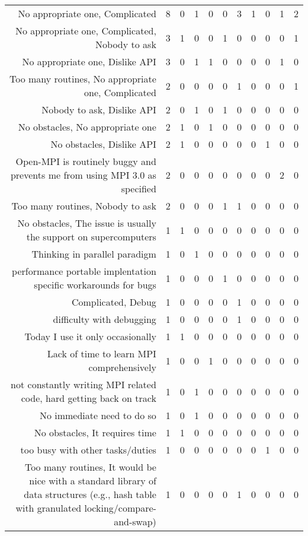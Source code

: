 {\begin{landscape}
\begin{longtable}[htb]{r|c|c|c|c|c|c|c|c|c|c}
{No appropriate one, Complicated} & 8 & 0 & 1 & 0 & 0 & 3 & 1 & 0 & 1 & 2 \\%
{No appropriate one, Complicated, Nobody to ask} & 3 & 1 & 0 & 0 & 1 & 0 & 0 & 0 & 0 & 1 \\%
{No appropriate one, Dislike API} & 3 & 0 & 1 & 1 & 0 & 0 & 0 & 0 & 1 & 0 \\%
{Too many routines, No appropriate one, Complicated} & 2 & 0 & 0 & 0 & 0 & 1 & 0 & 0 & 0 & 1 \\%
{Nobody to ask, Dislike API} & 2 & 0 & 1 & 0 & 1 & 0 & 0 & 0 & 0 & 0 \\%
{No obstacles, No appropriate one} & 2 & 1 & 0 & 1 & 0 & 0 & 0 & 0 & 0 & 0 \\%
{No obstacles, Dislike API} & 2 & 1 & 0 & 0 & 0 & 0 & 0 & 1 & 0 & 0 \\%
{Open-MPI is routinely buggy and prevents me from using MPI 3.0 as specified} & 2 & 0 & 0 & 0 & 0 & 0 & 0 & 0 & 2 & 0 \\%
{Too many routines, Nobody to ask} & 2 & 0 & 0 & 0 & 1 & 1 & 0 & 0 & 0 & 0 \\%
{No obstacles, The issue is usually the support on supercomputers} & 1 & 1 & 0 & 0 & 0 & 0 & 0 & 0 & 0 & 0 \\%
{Thinking in parallel paradigm} & 1 & 0 & 1 & 0 & 0 & 0 & 0 & 0 & 0 & 0 \\%
{performance portable  implentation specific workarounds for bugs} & 1 & 0 & 0 & 0 & 1 & 0 & 0 & 0 & 0 & 0 \\%
{Complicated, Debug} & 1 & 0 & 0 & 0 & 0 & 1 & 0 & 0 & 0 & 0 \\%
{difficulty with debugging} & 1 & 0 & 0 & 0 & 0 & 1 & 0 & 0 & 0 & 0 \\%
{Today I use it only occasionally} & 1 & 1 & 0 & 0 & 0 & 0 & 0 & 0 & 0 & 0 \\%
{Lack of time to learn MPI comprehensively} & 1 & 0 & 0 & 1 & 0 & 0 & 0 & 0 & 0 & 0 \\%
{not constantly writing MPI related code, hard getting back on track} & 1 & 0 & 1 & 0 & 0 & 0 & 0 & 0 & 0 & 0 \\%
{No immediate need to do so} & 1 & 0 & 1 & 0 & 0 & 0 & 0 & 0 & 0 & 0 \\%
{No obstacles, It requires time} & 1 & 1 & 0 & 0 & 0 & 0 & 0 & 0 & 0 & 0 \\%
{too busy with other tasks/duties} & 1 & 0 & 0 & 0 & 0 & 0 & 0 & 1 & 0 & 0 \\%
{Too many routines, It would be nice with a standard library of data structures (e.g., hash table with granulated locking/compare-and-swap)} & 1 & 0 & 0 & 0 & 0 & 1 & 0 & 0 & 0 & 0 \\%

\end{longtable}
\end{landscape}}
